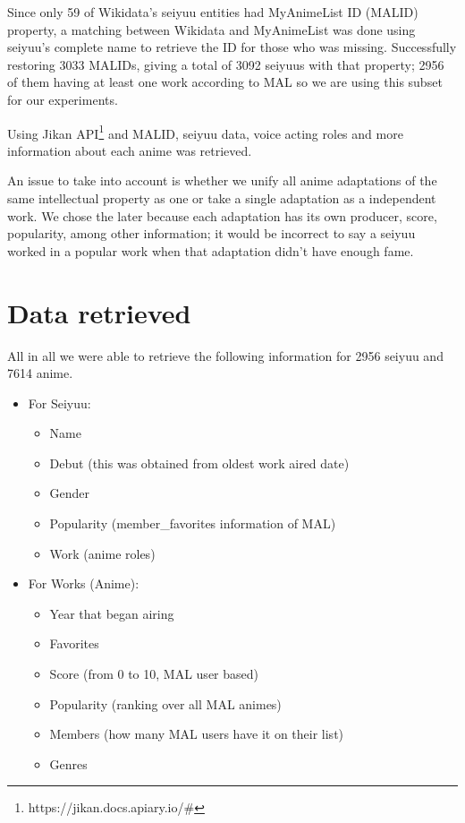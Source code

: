 Since only 59 of Wikidata's seiyuu entities had MyAnimeList ID (MALID) property, a matching between Wikidata and MyAnimeList was done using seiyuu's complete name to retrieve the ID for those who was missing. Successfully restoring 3033 MALIDs, giving a total of 3092 seiyuus with that property; 2956 of them having at least one work according to MAL so we are using this subset for our experiments.

Using Jikan API\footnote{https://jikan.docs.apiary.io/\#} and MALID, seiyuu data, voice acting roles and more information about each anime was retrieved. 

An issue to take into account is whether we unify all anime adaptations of the same intellectual property as one or take a single adaptation as a independent work. We chose the later because each adaptation has its own producer, score, popularity, among other information; it would be incorrect to say a seiyuu worked in a popular work when that adaptation didn't have enough fame.\\

\section{Data retrieved}
All in all we were able to retrieve the following information for 2956 seiyuu and 7614 anime.

\begin{itemize}
	\item For Seiyuu:
	\begin{itemize}
		\item Name
		\item Debut (this was obtained from oldest work aired date)
		\item Gender
		\item Popularity (member\_favorites information of MAL)
		\item Work (anime roles)
	\end{itemize}
	\item For Works (Anime):
	\begin{itemize}
		\item Year that began airing
		\item Favorites
		\item Score (from 0 to 10, MAL user based)
		\item Popularity (ranking over all MAL animes)
		\item Members (how many MAL users have it on their list)
		\item Genres
	\end{itemize}
\end{itemize}

